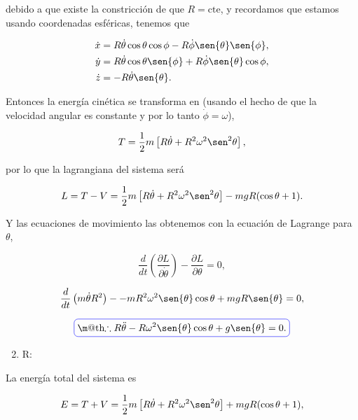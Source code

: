 \documentclass[a4paper,10pt]{article}
\makeatletter
\numberwithin{equation}{section}
\newcommand*{\boxcolor}{blue}
\renewcommand{\boxed}[1]{\textcolor{\boxcolor}{%
\tikz[baseline={([yshift=-1ex]current bounding box.center)}] \node [rectangle, minimum width=1ex,rounded corners,draw] {\normalcolor\m@th$\displaystyle#1$};}}
\makeatother
\begin{document}
debido a que existe la constricción de que $R = \text{cte}$, y recordamos que 
estamos usando coordenadas esféricas, tenemos que 

\begin{align*}
 \dot{x} &= R\dot{\theta}\cos{\theta}\cos{\phi} - R\dot{\phi}\sen{\theta}\sen{\phi}, \\
 \dot{y} &= R\dot{\theta}\cos{\theta}\sen{\phi} + R\dot{\phi}\sen{\theta}\cos{\phi}, \\
 \dot{z} &= - R\dot{\theta}\sen{\theta}.
\end{align*}

Entonces la energía cinética se transforma en (usando el hecho de que la velocidad 
angular es constante y por lo tanto $\dot{\phi} = \omega$),

\begin{equation}
 T = \frac{1}{2}m\left[R\dot{\theta} + R^2\omega^2\sen^2{\theta} \right],
\end{equation}

por lo que la lagrangiana del sistema será

\begin{equation}
 L = T - V = \frac{1}{2}m\left[R\dot{\theta} + R^2\omega^2\sen^2{\theta} \right] 
 -  mgR(\cos{\theta} + 1).
\end{equation}

Y las ecuaciones de movimiento las obtenemos con la ecuación de Lagrange para 
$\theta$, 

\begin{equation}
 \frac{d}{dt}\left(\frac{\partial L}{\partial \dot{\theta}}\right) - 
 \frac{\partial L}{\partial \theta} = 0,
\end{equation}

\begin{equation}
 \frac{d}{dt}\left( m\dot{\theta}R^2 \right) - 
 - mR^2\omega^2\sen{\theta}\cos{\theta} + mgR\sen{\theta}  = 0,
\end{equation}

\begin{equation}
 \boxed{\therefore R\ddot{\theta} - R\omega^2\sen{\theta}\cos{\theta} + g\sen{\theta}
 = 0.}
\end{equation}

\begin{enumerate}[label=\alph*)]
\setcounter{enumi}{1}
 \item R:
\end{enumerate}

La energía total del sistema es 

\begin{equation}
 E = T + V =  \frac{1}{2}m\left[R\dot{\theta} + R^2\omega^2\sen^2{\theta} \right] 
 +  mgR(\cos{\theta} + 1),
\end{equation}
\end{document}
